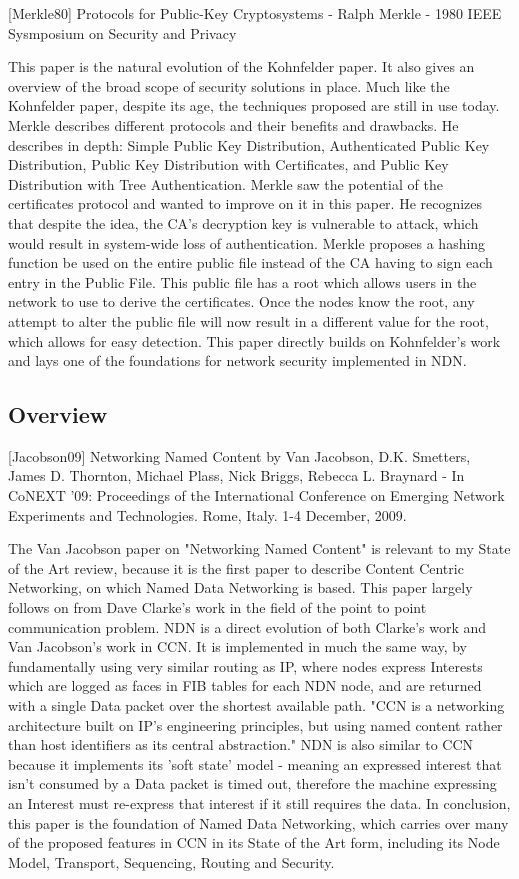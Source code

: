 [Merkle80] Protocols for Public-Key Cryptosystems - Ralph Merkle - 1980 IEEE Sysmposium on Security and Privacy

This paper is the natural evolution of the Kohnfelder paper. It also gives an overview of the broad scope of security solutions in place. Much like the Kohnfelder paper, despite its age, the techniques proposed are still in use today. Merkle describes different protocols and their benefits and drawbacks. He describes in depth: Simple Public Key Distribution, Authenticated Public Key Distribution, Public Key Distribution with Certificates, and Public Key Distribution with Tree Authentication. Merkle saw the potential of the certificates protocol and wanted to improve on it in this paper. He recognizes that despite the idea, the CA's decryption key is vulnerable to attack, which would result in system-wide loss of authentication. Merkle proposes a hashing function be used on the entire public file instead of the CA having to sign each entry in the Public File. This public file has a root which allows users in the network to use to derive the certificates. Once the nodes know the root, any attempt to alter the public file will now result in a different value for the root, which allows for easy detection. This paper directly builds on Kohnfelder's work and lays one of the foundations for network security implemented in NDN.  


\subsection{Overview}
[Jacobson09] Networking Named Content by Van Jacobson, D.K. Smetters, James D. Thornton, Michael Plass, Nick Briggs, Rebecca L. Braynard - In CoNEXT '09: Proceedings of the  International Conference on Emerging Network Experiments and Technologies. Rome, Italy. 1-4 December, 2009.

The Van Jacobson paper on "Networking Named Content" is relevant to my State of the Art review, because it is the first paper to describe Content Centric Networking, on which Named Data Networking is based. This paper largely follows on from Dave Clarke's work in the field of the point to point communication problem. NDN is a direct evolution of both Clarke's work and Van Jacobson's work in CCN. It is implemented in much the same way, by fundamentally using very similar routing as IP, where nodes express Interests which are logged as faces in FIB tables for each NDN node, and are returned with a single Data packet over the shortest available path. "CCN is a networking architecture built on IP's engineering principles, but using named content rather than host identifiers as its central abstraction." NDN is also similar to CCN because it implements its 'soft state' model - meaning an expressed interest that isn't consumed by  a Data packet is timed out, therefore the machine expressing an Interest must re-express that interest if it still requires the data. In conclusion, this paper is the foundation of Named Data Networking, which carries over many of the proposed features in CCN in its State of the Art form, including its Node Model, Transport, Sequencing, Routing and Security.


